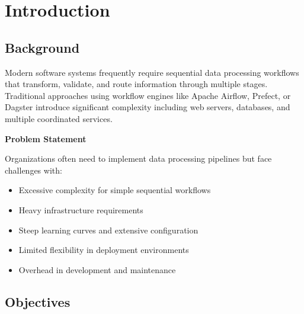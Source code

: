 \documentclass[12pt,a4paper]{report}
\begin{document}
\listoffigures
\cleardoublepage

\listoftables
\cleardoublepage

\lstlistoflistings
\cleardoublepage

\chapter{Introduction}
\cleardoublepage

\section{Background}

Modern software systems frequently require sequential data processing workflows that transform, validate, and route information through multiple stages. Traditional approaches using workflow engines like Apache Airflow, Prefect, or Dagster introduce significant complexity including web servers, databases, and multiple coordinated services.

\textbf{Problem Statement}

Organizations often need to implement data processing pipelines but face challenges with:
\begin{itemize}
    \item Excessive complexity for simple sequential workflows
    \item Heavy infrastructure requirements
    \item Steep learning curves and extensive configuration
    \item Limited flexibility in deployment environments
    \item Overhead in development and maintenance
\end{itemize}

\section{Objectives}
\end{document}
